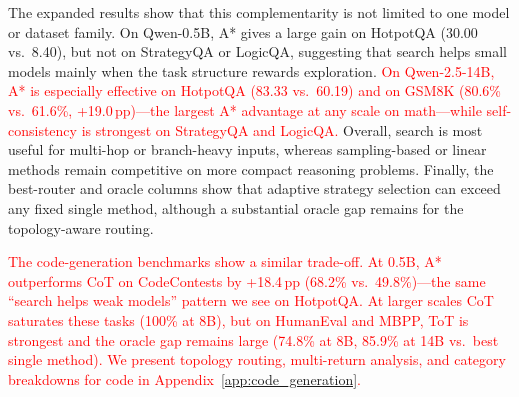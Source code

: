 \documentclass[10pt]{article}
\begin{document}
The expanded results show that this complementarity is not limited to one model or dataset family. On Qwen-0.5B, A* gives a large gain on HotpotQA (30.00 vs.\ 8.40), but not on StrategyQA or LogicQA, suggesting that search helps small models mainly when the task structure rewards exploration. \textcolor{red}{On Qwen-2.5-14B, A* is especially effective on HotpotQA (83.33 vs.\ 60.19) and on GSM8K (80.6\% vs.\ 61.6\%, +19.0\,pp)---the largest A* advantage at any scale on math---while self-consistency is strongest on StrategyQA and LogicQA.} Overall, search is most useful for multi-hop or branch-heavy inputs, whereas sampling-based or linear methods remain competitive on more compact reasoning problems. Finally, the best-router and oracle columns show that adaptive strategy selection can exceed any fixed single method, although a substantial oracle gap remains for the topology-aware routing.

\textcolor{red}{The code-generation benchmarks show a similar trade-off. At 0.5B, A* outperforms CoT on CodeContests by +18.4\,pp (68.2\% vs.\ 49.8\%)---the same ``search helps weak models'' pattern we see on HotpotQA. At larger scales CoT saturates these tasks (100\% at 8B), but on HumanEval and MBPP, ToT is strongest and the oracle gap remains large (74.8\% at 8B, 85.9\% at 14B vs.\ best single method). We present topology routing, multi-return analysis, and category breakdowns for code in Appendix~\ref{app:code_generation}.}

\end{document}
